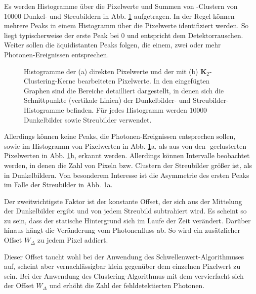 \noindent
Es werden Histogramme über die Pixelwerte und Summen von -Clustern von \num{10000} Dunkel- und Streubildern in Abb. \ref{fig:no_pr_cl_2_histograms} aufgetragen. In der Regel können mehrere Peaks in einem Histogramm über die Pixelwerte identifiziert werden. So liegt typischerweise der erste Peak bei \SI{0}{\adu} und entspricht dem Detektorrauschen. Weiter sollen die äquidistanten Peaks folgen, die einem, zwei oder mehr Photonen-Ereignissen entsprechen.
\begin{figure}[H]
    \centering
    
    \caption{Histogramme der (a) direkten Pixelwerte und der mit (b) $\mathbf{K}_2$-Clustering-Kerne bearbeiteten Pixelwerte. In den eingefügten Graphen sind die Bereiche detailliert dargestellt, in denen sich die Schnittpunkte (vertikale Linien) der Dunkelbilder- und Streubilder-Histogramme befinden. Für jedes Histogramm werden \num{10000} Dunkelbilder sowie Streubilder verwendet.}
    \label{fig:no_pr_cl_2_histograms}
\end{figure}
\noindent
Allerdings können keine Peaks, die Photonen-Ereignissen entsprechen sollen, sowie im Histogramm von Pixelwerten in Abb. \ref{fig:no_pr_cl_2_histograms}a, als aus von den -geclusterten Pixelwerten in Abb. \ref{fig:no_pr_cl_2_histograms}b, erkannt werden. Allerdings können Intervalle beobachtet werden, in denen die Zahl von Pixeln bzw. Clustern der Streubilder größer ist, als in Dunkelbildern. Von besonderem Interesse ist die Asymmetrie des ersten Peaks im Falle der Streubilder in Abb. \ref{fig:no_pr_cl_2_histograms}a.

\noindent
Der zweitwichtigste Faktor ist der konstante Offset, der sich aus der Mittelung der Dunkelbilder ergibt und von jedem Streubild subtrahiert wird. Es scheint so zu sein, dass der statische Hintergrund sich im Laufe der Zeit verändert. Darüber hinaus hängt die Veränderung vom Photonenfluss ab. So wird ein zusätzlicher Offset $W_\Delta$ zu jedem Pixel addiert.

\noindent
Dieser Offset taucht wohl bei der Anwendung des Schwellenwert-Algorithmuses auf, scheint aber vernachlässigbar klein gegenüber dem einzelnen Pixelwert zu sein. Bei der Anwendung des Clustering-Algorithmus mit dem  vervierfacht sich der Offset $W_\Delta$ und erhöht die Zahl der fehldetektierten Photonen.

